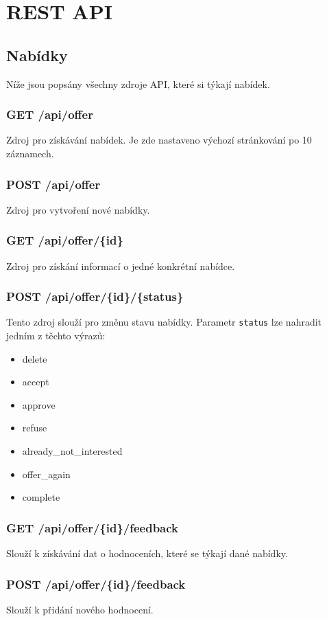 \section{REST API}

\subsection{Nabídky}
Níže jsou popsány všechny zdroje API, které si týkají nabídek.

\subsubsection{GET /api/offer}
Zdroj pro získávání nabídek. Je zde nastaveno výchozí stránkování po 10 záznamech.

\subsubsection{POST /api/offer}
Zdroj pro vytvoření nové nabídky.

\subsubsection{GET /api/offer/\{id\}}
Zdroj pro získání informací o jedné konkrétní nabídce.

\subsubsection{POST /api/offer/\{id\}/\{status\}}
Tento zdroj slouží pro změnu stavu nabídky. Parametr \texttt{status} lze nahradit jedním z těchto výrazů:
\begin{itemize}
    \item delete
    \item accept
    \item approve
    \item refuse
    \item already\_not\_interested
    \item offer\_again
    \item complete
\end{itemize}

\subsubsection{GET /api/offer/\{id\}/feedback}
Slouží k získávání dat o hodnoceních, které se týkají dané nabídky.

\subsubsection{POST /api/offer/\{id\}/feedback}
Slouží k přidání nového hodnocení.

